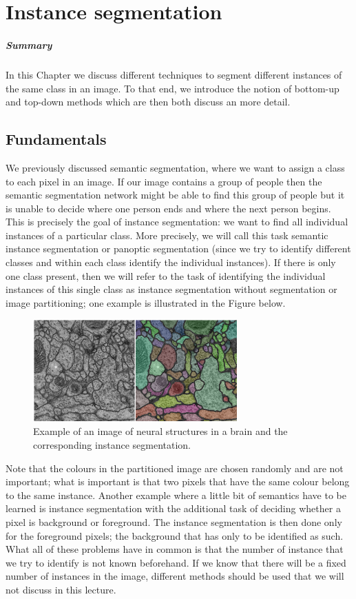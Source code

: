 \chapter{Instance segmentation}%
\label{chap:05}

\paragraph{Summary}
In this Chapter we discuss different techniques to segment different instances
of the same class in an image. To that end, we introduce the notion of bottom-up
and top-down methods which are then both discuss an more detail.

\section{Fundamentals}
We previously discussed semantic segmentation, where we want to assign a class
to each pixel in an image. If our image contains a group of people then the
semantic segmentation network might be able to find this group of people but it
is unable to decide where one person ends and where the next person begins.
This is precisely the goal of instance segmentation: we want to find all
individual instances of a particular class. More precisely, we will call this
task semantic instance segmentation or panoptic segmentation (since we try to
identify different classes and within each class identify the individual
instances). If there is only one class present, then we will refer to the task
of identifying the individual instances of this single class as instance
segmentation without segmentation or image partitioning; one example is
illustrated in the Figure below.
\begin{figure}[htpb]
  \centering
  \includegraphics[width=0.7\textwidth]{Figures/instance_segmentation}
  \caption{Example of an image of neural structures in a brain and the
    corresponding instance segmentation.}%
  \label{fig:instanceseg}
\end{figure}
Note that the colours in the partitioned image are chosen randomly and are not
important; what is important is that two pixels that have the same colour belong
to the same instance. Another example where a little bit of semantics have to be
learned is instance segmentation with the additional task of deciding whether a
pixel is background or foreground. The instance segmentation is then done only
for the foreground pixels; the background that has only to be identified as
such. What all of these problems have in common is that the number of instance
that we try to identify is not known beforehand. If we know that there will be a
fixed number of instances in the image, different methods should be used that we
will not discuss in this lecture.

